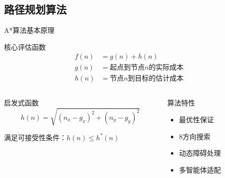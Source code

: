 \documentclass[
10pt,
aspectratio=169,
]{beamer}
\begin{document}
\subsection{路径规划算法}
\begin{frame}{A*算法基本原理}
    \begin{alertblock}{核心评估函数}
        \begin{align}
            f(n) &= g(n) + h(n) \\
            g(n) &= \text{起点到节点}n\text{的实际成本} \\
            h(n) &= \text{节点}n\text{到目标的估计成本}
        \end{align}
    \end{alertblock}
    
    \begin{columns}
        \begin{column}{0.5\textwidth}
            \begin{exampleblock}{启发式函数}
                \begin{equation}
                    h(n) = \sqrt{(n_x - g_x)^2 + (n_y - g_y)^2}
                \end{equation}
                
                满足可接受性条件：$h(n) \leq h^*(n)$
            \end{exampleblock}
        \end{column}
        \begin{column}{0.5\textwidth}
            \begin{alertblock}{算法特性}
                \begin{itemize}
                    \item 最优性保证
                    \item 8方向搜索
                    \item 动态障碍处理
                    \item 多智能体适配
                \end{itemize}
            \end{alertblock}
        \end{column}
    \end{columns}
\end{frame}
\end{document}
